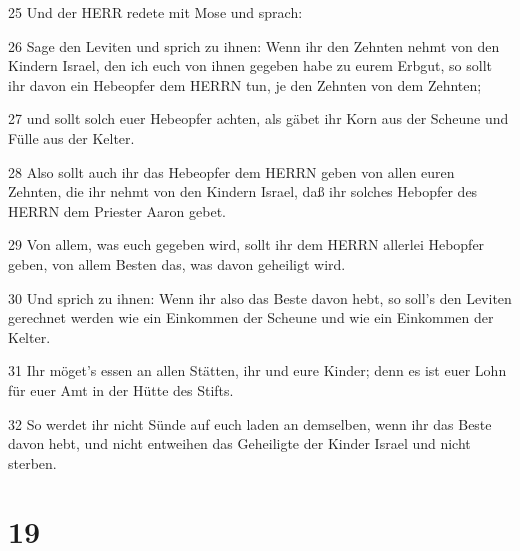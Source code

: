 \par 25 Und der HERR redete mit Mose und sprach:
\par 26 Sage den Leviten und sprich zu ihnen: Wenn ihr den Zehnten nehmt von den Kindern Israel, den ich euch von ihnen gegeben habe zu eurem Erbgut, so sollt ihr davon ein Hebeopfer dem HERRN tun, je den Zehnten von dem Zehnten;
\par 27 und sollt solch euer Hebeopfer achten, als gäbet ihr Korn aus der Scheune und Fülle aus der Kelter.
\par 28 Also sollt auch ihr das Hebeopfer dem HERRN geben von allen euren Zehnten, die ihr nehmt von den Kindern Israel, daß ihr solches Hebopfer des HERRN dem Priester Aaron gebet.
\par 29 Von allem, was euch gegeben wird, sollt ihr dem HERRN allerlei Hebopfer geben, von allem Besten das, was davon geheiligt wird.
\par 30 Und sprich zu ihnen: Wenn ihr also das Beste davon hebt, so soll's den Leviten gerechnet werden wie ein Einkommen der Scheune und wie ein Einkommen der Kelter.
\par 31 Ihr möget's essen an allen Stätten, ihr und eure Kinder; denn es ist euer Lohn für euer Amt in der Hütte des Stifts.
\par 32 So werdet ihr nicht Sünde auf euch laden an demselben, wenn ihr das Beste davon hebt, und nicht entweihen das Geheiligte der Kinder Israel und nicht sterben.

\chapter{19}

